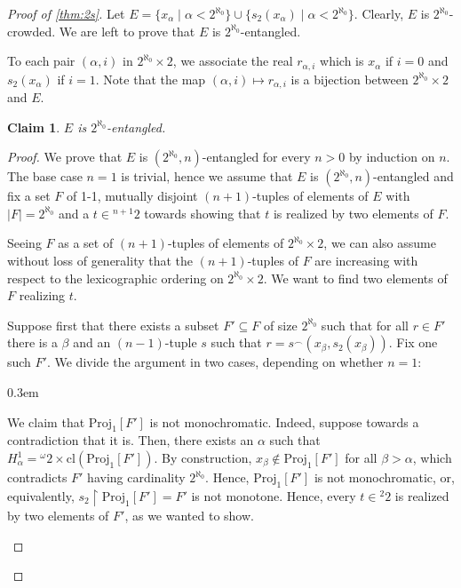 \documentclass[12pt]{amsart}
\newtheorem{claim}{Claim}[theorem]
\theoremstyle{definition}
\theoremstyle{remark}
\begin{document}
\begin{proof}[Proof of \cref{thm:2s}]
Let $E = \{x_\alpha \mid \alpha < 2^{\aleph_0}\} \cup \{s_2(x_\alpha) \mid \alpha < 2^{\aleph_0}\}$. Clearly, $E$ is $2^{\aleph_0}$-crowded. We are left to prove that $E$ is $2^{\aleph_0}$-entangled. 


To each pair $(\alpha, i)$ in $2^{\aleph_0} \times 2$, we associate the real $r_{\alpha, i}$ which is $x_\alpha$ if $i = 0$ and $s_2(x_\alpha)$ if $i = 1$. Note that the map $(\alpha, i) \mapsto r_{\alpha, i}$ is a bijection between $2^{\aleph_0} \times 2$ and $E$.

\begin{claim}
$E$ is $2^{\aleph_0}$-entangled.
\end{claim}
\begin{proof}

We prove that $E$ is $(2^{\aleph_0}, n)$-entangled for every $n> 0$ by induction on $n$. The base case $n=1$ is trivial, hence we assume that $E$ is $(2^{\aleph_0}, n)$-entangled  and fix a set $F$ of 1-1, mutually disjoint $(n+1)$-tuples of elements of $E$  with $|F| = 2^{\aleph_0}$ and a $t \in {}^{n+1} 2$ towards showing that $t$ is realized by two elements of $F$.

Seeing $F$ as a set of $(n+1)$-tuples of elements of $2^{\aleph_0} \times 2$, we can also assume without loss of generality that the $(n+1)$-tuples of $F$ are increasing with respect to the lexicographic ordering on  $2^{\aleph_0} \times 2$. We want to find two elements of $F$ realizing $t$.

Suppose first that there exists a subset $F' \subseteq F$ of size $2^{\aleph_0}$ such that for all $r \in F'$ there is a $\beta$ and an $(n-1)$-tuple $s$ such that $r = s^\smallfrown (x_\beta, s_2(x_\beta))$. Fix one such $F'$. We divide the argument in two cases, depending on whether $n = 1$:

\begin{description}
\itemsep0.3em
\item[$n=1$] We claim that $\mathrm{Proj}_1[F']$ is not monochromatic. Indeed, suppose towards a contradiction that it is. Then, there exists an $\alpha$ such that $H_\alpha^1 = {}^\omega 2\times \mathrm{cl}(\mathrm{Proj}_1[F'])$. By construction, $x_\beta \not\in \mathrm{Proj}_1[F']$ for all $\beta > \alpha$, which contradicts $F'$ having cardinality $2^{\aleph_0}$. Hence, $\mathrm{Proj}_1[F']$ is not monochromatic, or, equivalently, $s_2 \upharpoonright \mathrm{Proj}_1[F'] = F'$ is not monotone. Hence, every $t \in {}^2 2$ is realized by two elements of $F'$, as we wanted to show.


\end{description}
\end{proof}
\end{proof}
\end{document}
